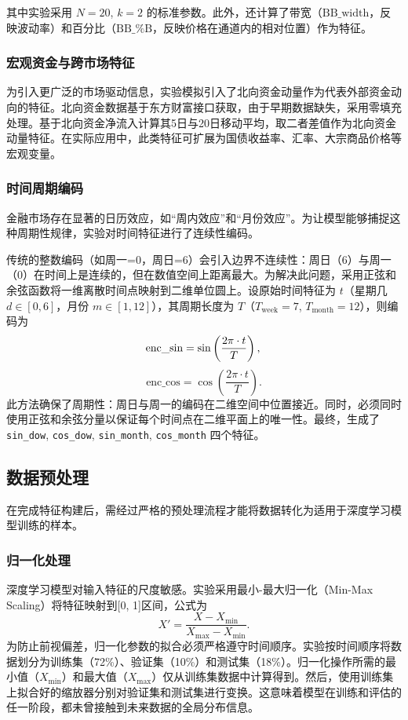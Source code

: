 \documentclass[UTF8,AutoFakeBold=1,AutoFakeSlant,zihao=-4]{SCAU}
\begin{document}
其中实验采用 $N=20$, $k=2$ 的标准参数。此外，还计算了带宽（$\text{BB\_width}$，反映波动率）和百分比（$\text{BB\_\%B}$，反映价格在通道内的相对位置）作为特征。

\subsubsection{宏观资金与跨市场特征}
为引入更广泛的市场驱动信息，实验模拟引入了北向资金动量作为代表外部资金动向的特征。北向资金数据基于东方财富接口获取，由于早期数据缺失，采用零填充处理。基于北向资金净流入计算其5日与20日移动平均，取二者差值作为北向资金动量特征。在实际应用中，此类特征可扩展为国债收益率、汇率、大宗商品价格等宏观变量。

\subsubsection{时间周期编码}
金融市场存在显著的日历效应，如“周内效应”和“月份效应”。为让模型能够捕捉这种周期性规律，实验对时间特征进行了连续性编码。

传统的整数编码（如周一=0，周日=6）会引入边界不连续性：周日（6）与周一（0）在时间上是连续的，但在数值空间上距离最大。为解决此问题，采用正弦和余弦函数将一维离散时间点映射到二维单位圆上。设原始时间特征为 $t$（星期几 $d \in [0,6]$，月份 $m \in [1,12]$），其周期长度为 $T$（$T_{\text{week}}=7$, $T_{\text{month}}=12$），则编码为
\begin{equation}
  \text{enc\_sin} = \sin\left(\frac{2\pi \cdot t}{T}\right), \\
\end{equation}
\begin{equation}
  \text{enc\_cos} = \cos\left(\frac{2\pi \cdot t}{T}\right).
\end{equation}
此方法确保了周期性：周日与周一的编码在二维空间中位置接近。同时，必须同时使用正弦和余弦分量以保证每个时间点在二维平面上的唯一性。最终，生成了 \texttt{sin\_dow}, \texttt{cos\_dow}, \texttt{sin\_month}, \texttt{cos\_month} 四个特征。

\subsection{数据预处理}
在完成特征构建后，需经过严格的预处理流程才能将数据转化为适用于深度学习模型训练的样本。

\subsubsection{归一化处理}
深度学习模型对输入特征的尺度敏感。实验采用最小-最大归一化（Min-Max Scaling）将特征映射到[0, 1]区间，公式为
\begin{equation}
  X' = \frac{X - X_{\min}}{X_{\max} - X_{\min}}.
\end{equation}
为防止前视偏差，归一化参数的拟合必须严格遵守时间顺序。实验按时间顺序将数据划分为训练集（72\%）、验证集（10\%）和测试集（18\%）。归一化操作所需的最小值（$X_{\min}$）和最大值（$X_{\max}$）仅从训练集数据中计算得到。然后，使用训练集上拟合好的缩放器分别对验证集和测试集进行变换。这意味着模型在训练和评估的任一阶段，都未曾接触到未来数据的全局分布信息。
\end{document}
